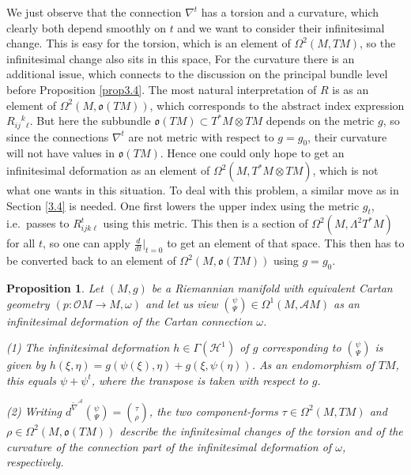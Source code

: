 \documentclass[12pt,a4paper]{amsart}
\def\frak{\mathfrak}
\def\Cal{\mathcal}
\newcommand{\om}{\omega}
\newcommand{\Ga}{\Gamma}
\newcommand{\La}{\Lambda}
\newcommand{\Om}{\Omega}
\newcommand{\tn}{\widetilde{\nabla}}
\newcounter{theorem}
\numberwithin{theorem}{section}
\numberwithin{equation}{section}
\newtheorem{prop}[theorem]{Proposition}
\theoremstyle{definition}
\theoremstyle{remark}
\begin{document}
We just observe that the connection $\nabla^t$ has a torsion and a curvature, which
clearly both depend smoothly on $t$ and we want to consider their infinitesimal
change. This is easy for the torsion, which is an element of $\Om^2(M,TM)$, so the
infinitesimal change also sits in this space, For the curvature there is an
additional issue, which connects to the discussion on the principal bundle level
before Proposition \ref{prop3.4}. The most natural interpretation of $R$ is as an
element of $\Om^2(M,\frak o(TM))$, which corresponds to the abstract index expression
$R_{ij}{}^k{}_\ell$. But here the subbundle $\frak o(TM)\subset T^*M\otimes TM$
depends on the metric $g$, so since the connections $\nabla^t$ are not metric with
respect to $g=g_0$, their curvature will not have values in $\frak o(TM)$. Hence one
could only hope to get an infinitesimal deformation as an element of
$\Om^2(M,T^*M\otimes TM)$, which is not what one wants in this situation. To deal
with this problem, a similar move as in Section \ref{3.4} is needed. One first lowers
the upper index using the metric $g_t$, i.e.~passes to $R^t_{ijk\ell}$ using this
metric. This then is a section of $\Om^2(M,\La^2T^*M)$ for all $t$, so one can apply
$\tfrac{d}{dt}|_{t=0}$ to get an element of that space. This then has to be converted
back to an element of $\Om^2(M,\frak o(TM))$ using $g=g_0$.
\begin{prop}\label{prop3.5}
Let $(M,g)$ be a Riemannian manifold with equivalent Cartan geometry $(p:\Cal OM\to
M,\om)$ and let us view $\binom{\psi}{\Psi}\in\Om^1(M,\Cal AM)$ as an infinitesimal
deformation of the Cartan connection $\om$.

(1) The infinitesimal deformation $h\in\Ga(\Cal H^1)$ of $g$ corresponding to
$\binom{\psi}{\Psi}$ is given by
$h(\xi,\eta)=g(\psi(\xi),\eta)+g(\xi,\psi(\eta))$. As an endomorphism of $TM$, this
equals $\psi+\psi^t$, where the transpose is taken with respect to $g$.

(2) Writing $d^{\tn^{\Cal A}}\binom{\psi}{\Psi}=\binom{\tau}{\rho}$, the two
component-forms $\tau\in\Om^2(M,TM)$ and $\rho\in\Om^2(M,\frak o(TM))$ describe the
infinitesimal changes of the torsion and of the curvature of the connection part of
the infinitesimal deformation of $\om$, respectively.
\end{prop}
\end{document}
